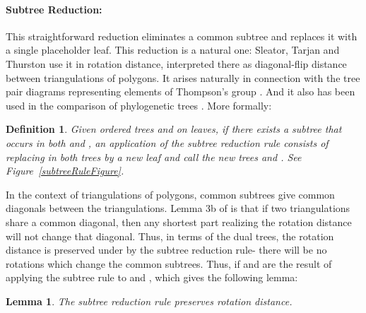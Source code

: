 \documentclass[12pt]{article}
\newtheorem{lemma}[theorem]{Lemma}
\newtheorem{definition}{Definition}
\begin{document}
\paragraph{Subtree Reduction:}  This straightforward reduction eliminates a
common subtree and replaces it with a single placeholder leaf.
This reduction is a natural one: Sleator, Tarjan and Thurston \cite{stt}
use it in rotation distance, interpreted there as diagonal-flip distance between triangulations of polygons.
It arises naturally in connection with the tree pair diagrams representing elements of Thompson's group  \cite{rotipl}.
And it also has been used in the comparison of phylogenetic trees 
\cite{allenSteel}. 
More formally:
\begin{definition}
Given ordered trees  and  on 
leaves, if 
there exists a subtree  that occurs in both 
and , an application of the {\em subtree reduction rule} consists of replacing 
 in both trees by a new leaf  and 
call the new trees  and .  See 
Figure~\ref{subtreeRuleFigure}.  
\end{definition}

In the context of triangulations of polygons, common subtrees give common diagonals between the triangulations.
Lemma 3b of
\cite{stt} is that if two triangulations share a common diagonal, then any shortest part realizing the rotation distance will
not change that diagonal. Thus, in terms of the dual trees, the rotation distance is preserved 
under by the subtree reduction rule- there will be no rotations which change the common subtrees.  Thus, 
 if  and  
are the result of applying the subtree rule to  and , which gives the following lemma:

\begin{lemma}  \cite{stt}  \label{lemsubtree}
The subtree reduction rule preserves
rotation distance.
\end{lemma}
\end{document}
